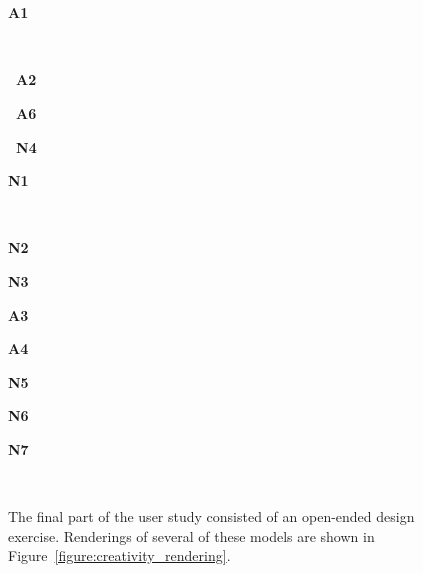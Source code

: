 \begin{figure}[t]
\begin{minipage}{1.62in}~\end{minipage}
\begin{minipage}{1.62in}~\end{minipage}
\begin{minipage}{0.8in}{\bf A1}\end{minipage}
\vspace{0.85in}
\\
\begin{minipage}{1.62in}{\bf ~A2}\end{minipage}
\begin{minipage}{1.62in}{\bf ~A6}\end{minipage}
\begin{minipage}{1.62in}{\bf ~N4}\end{minipage}
\begin{minipage}{0.8in}{\bf N1}\end{minipage}
\vspace{0.85in}
\\
\begin{minipage}{0.8in}{\bf N2}\end{minipage}
\begin{minipage}{0.8in}{\bf N3}\end{minipage}
\begin{minipage}{0.8in}{\bf A3}\end{minipage}
\begin{minipage}{0.8in}{\bf A4}\end{minipage}
\begin{minipage}{0.8in}{\bf N5}\end{minipage}
\begin{minipage}{0.8in}{\bf N6}\end{minipage}
\begin{minipage}{0.8in}{\bf N7}\end{minipage}\vspace{-0.1in}
\\
  \caption{The final part of the user study consisted of an open-ended
    design exercise.  Renderings of several of these models are shown in Figure~\ref{figure:creativity_rendering}.}
\vspace{-0.1in}
\label{figure:new_designs}
\end{figure}
